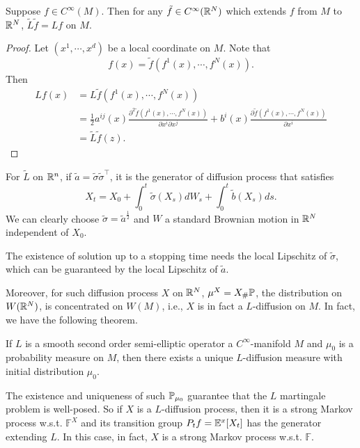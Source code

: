 \begin{lem}
    Suppose $f \in C^\infty(M)$. Then for any $\tilde{f} \in C^\infty(\mathbb{R}^N)$ which extends $f$ from $M$ to $\mathbb{R}^N$, $\tilde{L}\tilde{f} = Lf$ on $M$.
\end{lem}
\begin{proof}
    Let $(x^1,\cdots,x^d)$ be a local coordinate on $M$. Note that
    \begin{equation*}
        f(x) = \tilde{f}(f^1(x),\cdots,f^N(x)).
    \end{equation*}
    Then
    \begin{align*}
        Lf(x) &= L \tilde{f}(f^1(x),\cdots,f^N(x)) \\
        &= \frac{1}{2} a^{i j}(x) \frac{\partial^2 \tilde{f}(f^1(x),\cdots,f^N(x))}{\partial x^i \partial x^j}+ b^i(x) \frac{\partial \tilde{f}(f^1(x),\cdots,f^N(x))}{\partial x^i} \\
        &= \tilde{L}\tilde{f}(z).
    \end{align*}
\end{proof}

For $\tilde{L}$ on $\mathbb{R}^n$, if $\tilde{a} = \tilde{\sigma}\tilde{\sigma}^\top$, it is the generator of diffusion process that satisfies
\begin{equation*}
    X_t = X_0 + \int_0^t \tilde{\sigma}(X_s)dW_s + \int_0^t \tilde{b}(X_s)ds.
\end{equation*}
We can clearly choose $\tilde{\sigma} = \tilde{a}^{\frac{1}{2}}$ and $W$ a standard Brownian motion in $\mathbb{R}^N$ independent of $X_0$.
\begin{rmk}
    The existence of solution up to a stopping time needs the local Lipschitz of $\tilde{\sigma}$, which can be guaranteed by the local Lipschitz of $\tilde{a}$.
\end{rmk}

Moreover, for such diffusion process $X$ on $\mathbb{R}^N$, $\mu^X = X_{\#}\mathbb{P}$, the distribution on $W(\mathbb{R}^N)$, is concentrated on $W(M)$, i.e., $X$ is in fact a $L$-diffusion on $M$. In fact, we have the following theorem.

\begin{thm}
    If $L$ is a smooth second order semi-elliptic operator a $C^\infty$-manifold $M$ and $\mu_0$ is a probability measure on $M$, then there exists a unique $L$-diffusion measure with initial distribution $\mu_0$.
\end{thm}
\begin{rmk}
    The existence and uniqueness of such $\mathbb{P}_{\mu_0}$ guarantee that the $L$ martingale problem is well-posed. So if $X$ is a $L$-diffusion process, then it is a strong Markov process w.s.t. $\mathbb{F}^X$ and its transition group $P_tf = \mathbb{E}^x[X_t]$ has the generator extending $L$. In this case, in fact, $X$ is a strong Markov process w.s.t. $\mathbb{F}$.
\end{rmk}


